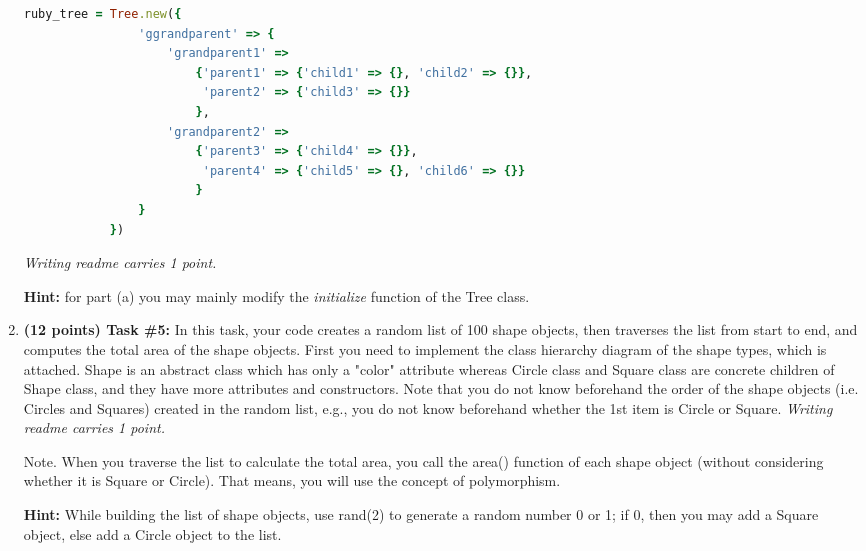 \documentclass[paper=letter, fontsize=11pt]{scrartcl} %
\begin{document}
\begin{enumerate}[noitemsep]
        \begin{lstlisting}[language=Ruby]
            ruby_tree = Tree.new({
                'ggrandparent' => { 
                    'grandparent1' => 
                        {'parent1' => {'child1' => {}, 'child2' => {}},
                         'parent2' => {'child3' => {}} 
                        }, 
                    'grandparent2' => 
                        {'parent3' => {'child4' => {}}, 
                         'parent4' => {'child5' => {}, 'child6' => {}} 
                        }
                } 
            })
        \end{lstlisting}
\emph{Writing readme carries 1 point.}

\textbf{Hint:} for part (a) you may mainly modify the \emph{initialize} function of the Tree class.
       \item \textbf{(12 points) Task \#5:} In this task, your code creates a random list of 100 shape objects, 
then traverses the list from start to end, and computes the total area of the shape objects. 
First you need to implement the class hierarchy diagram of the shape types, which is attached. 
Shape is an abstract class which has only a "color" attribute whereas Circle class and Square
class are concrete children of Shape class, and they have more attributes and constructors. 
Note that you do not know beforehand the order of the shape objects 
(i.e. Circles and Squares) created in the random list, e.g., 
you do not know beforehand whether the 1st item is Circle or Square.
\emph{Writing readme carries 1 point.}

Note. When you traverse the list to calculate the total area, you call the area() function 
of each shape object (without considering whether it is Square or Circle). 
That means, you will use the concept of polymorphism.

\textbf{Hint:} While building the list of shape objects, use rand(2) to generate a random number 0 or 1; if 0, then you may add a Square object, else add a Circle object to the list.
    \end{enumerate}
       
\end{document}
